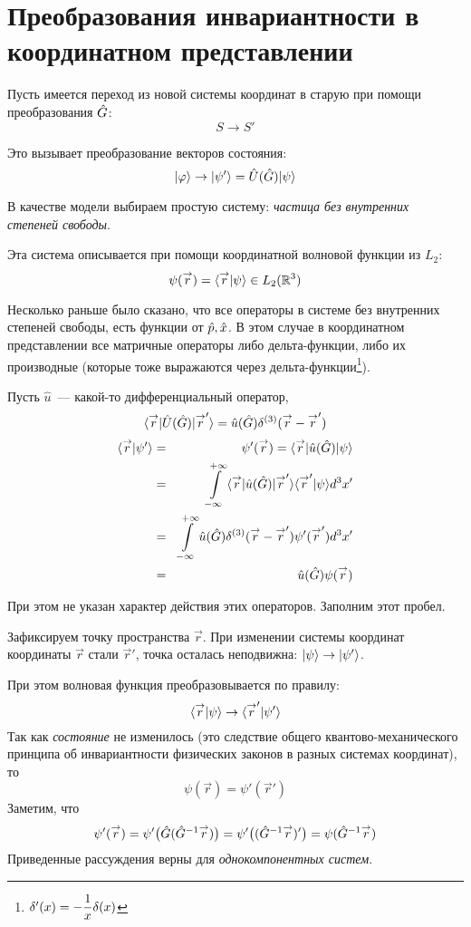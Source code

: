 \section{Преобразования инвариантности в координатном представлении}
Пусть имеется переход из новой системы координат в старую при помощи преобразования $\Hat G$:
$$
    S \to S'
$$

Это вызывает преобразование векторов состояния:
$$
    \qu \phi \to \qu{\psi'} = \hat U (\Hat G) \qu \psi
$$

В качестве модели выбираем простую систему: \emph{частица без внутренних степеней свободы}.

Эта система описывается при помощи координатной волновой функции из $L_2$:
$$
    \psi(\vec r) = \qs{\vec r}{\psi} \in L_2 (\R^3)
$$

\Ans Несколько раньше было сказано, что все операторы в системе без внутренних степеней свободы, есть функции от $\Hat p, \Hat x$. В этом случае в координатном представлении все матричные операторы либо дельта-функции, либо их производные (которые тоже выражаются через дельта-функции\footnote{$\dta'(x) = -\dfrac{1}{x}\dta(x)$}).

Пусть $\hat u$~--- какой-то дифференциальный оператор,
$$
    \qtri{\vec r}{\Hat U (\Hat G)}{\vec r'} = \hat u (\Hat G) \dta^{(3)} (\vec r - \vec r')
$$
\begin{eqnarray*}
    \qs{\vec r}{\psi'} &=& \psi'(\vec r) = \qtri{\vec r}{\hat u(\Hat G)}{\psi}\\
    &=& \int\limits_{-\infty}^{+\infty} \qtri{\vec r}{\hat u (\Hat G)}{\vec r'}\qs{\vec r'}{\psi} d^3 x'\\
    &=& \int\limits_{-\infty}^{+\infty} \hat u(\Hat G) \dta^{(3)} (\vec r - \vec r') \psi'(\vec r') d^3 x'\\
    &=&\hat u(\Hat G) \psi(\vec r)
\end{eqnarray*}

При этом не указан характер действия этих операторов. Заполним этот пробел.

Зафиксируем точку пространства $\vec r$. При изменении системы координат координаты $\vec r$ стали $\vec r'$, точка осталась неподвижна: $\qu \psi \to \qu{\psi'}$.

При этом волновая функция преобразовывается по правилу:
$$
    \qs{\vec r}{\psi} \to \qs{\vec r'}{\psi'}
$$
Так как \emph{состояние} не изменилось (это следствие общего квантово-механического принципа об инвариантности физических законов в разных системах координат), то
$$
    \psi(\vec r) = \psi' (\vec r')
$$
Заметим, что
$$
    \psi'(\vec r) = \psi' \big(\Hat G(\hat G^{-1} \vec r)\big) = \psi'\big( (\Hat G^{-1} \vec r)' \big) = \psi(\Hat G^{-1}\vec r)
$$
\Rem Приведенные рассуждения верны для \emph{однокомпонентных систем}.

